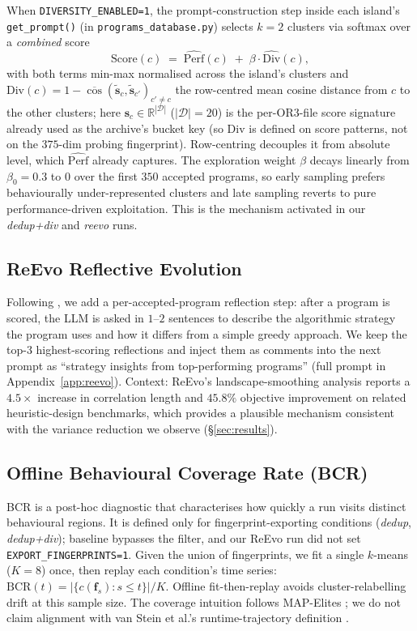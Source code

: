 \documentclass{article}
\begin{document}
When \texttt{DIVERSITY\_ENABLED=1}, the prompt-construction step inside each
island's \texttt{get\_prompt()} (in \texttt{programs\_database.py}) selects $k{=}2$
clusters via softmax over a \emph{combined} score
\[
\mathrm{Score}(c) \;=\; \widehat{\mathrm{Perf}}(c) \;+\; \beta\cdot\widehat{\mathrm{Div}}(c),
\]
with both terms min-max normalised across the island's clusters and
$\mathrm{Div}(c) = 1 - \overline{\cos}(\tilde{\mathbf{s}}_c, \tilde{\mathbf{s}}_{c'})_{c'\ne c}$
the row-centred mean cosine distance from $c$ to the other clusters; here
$\mathbf{s}_c \in \mathbb{R}^{|\mathcal{D}|}$ ($|\mathcal{D}|{=}20$) is the per-OR3-file
score signature already used as the archive's bucket key (so $\mathrm{Div}$ is
defined on score patterns, not on the $375$-dim probing fingerprint). Row-centring
decouples it from absolute level, which $\widehat{\mathrm{Perf}}$ already captures.
The exploration weight
$\beta$ decays linearly from $\beta_0{=}0.3$ to $0$ over the first $350$ accepted
programs, so early sampling prefers behaviourally under-represented clusters and
late sampling reverts to pure performance-driven exploitation. This is the
mechanism activated in our \emph{dedup+div} and \emph{reevo} runs.

\subsection{ReEvo Reflective Evolution}
\label{sec:reevo}

Following \citet{ye2024reevo}, we add a per-accepted-program reflection step: after a
program is scored, the LLM is asked in $1$--$2$ sentences to describe the algorithmic
strategy the program uses and how it differs from a simple greedy approach. We keep
the top-$3$ highest-scoring reflections and inject them as comments into the next
prompt as ``strategy insights from top-performing programs'' (full prompt in
Appendix~\ref{app:reevo}). Context: ReEvo's landscape-smoothing analysis
\citep[Table~4]{ye2024reevo} reports a $4.5\times$ increase in correlation length and
$45.8\%$ objective improvement on related heuristic-design benchmarks, which provides
a plausible mechanism consistent with the variance reduction we observe
(\S\ref{sec:results}).

\subsection{Offline Behavioural Coverage Rate (BCR)}
\label{sec:bcr}

BCR is a post-hoc diagnostic that characterises how quickly a run visits distinct
behavioural regions. It is defined only for fingerprint-exporting conditions
(\emph{dedup}, \emph{dedup+div}); baseline bypasses the filter, and our ReEvo run
did not set \texttt{EXPORT\_FINGERPRINTS=1}. Given the union of fingerprints, we fit
a single $k$-means ($K{=}8$) once, then replay each condition's time series:
$\mathrm{BCR}(t)=|\{c(\mathbf{f}_s):s\le t\}|/K$. Offline fit-then-replay avoids
cluster-relabelling drift at this sample size. The coverage intuition follows
MAP-Elites \citep{mouret2015illuminating,alphaevolve2025}; we do not claim alignment
with van Stein et al.'s runtime-trajectory definition \citep{vanstein2025llm}.
\end{document}
